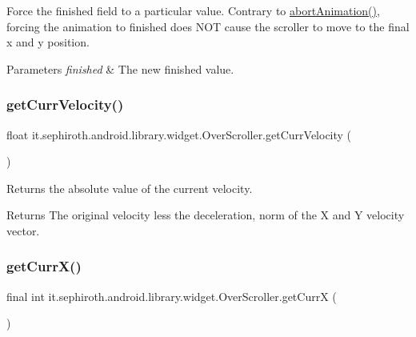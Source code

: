 Force the finished field to a particular value. Contrary to \hyperlink{classit_1_1sephiroth_1_1android_1_1library_1_1widget_1_1_over_scroller_afd65ddc97c8b8c2b2fbafd73e3cff65e}{abort\+Animation()}, forcing the animation to finished does N\+OT cause the scroller to move to the final x and y position.


\begin{DoxyParams}{Parameters}
{\em finished} & The new finished value. \\
\hline
\end{DoxyParams}
\mbox{\label{classit_1_1sephiroth_1_1android_1_1library_1_1widget_1_1_over_scroller_a600fe3b88690cc20248e7ab2379f4015}} 
\subsubsection{\texorpdfstring{get\+Curr\+Velocity()}{getCurrVelocity()}}
{\footnotesize\ttfamily float it.\+sephiroth.\+android.\+library.\+widget.\+Over\+Scroller.\+get\+Curr\+Velocity (\begin{DoxyParamCaption}{ }\end{DoxyParamCaption})}

Returns the absolute value of the current velocity.

\begin{DoxyReturn}{Returns}
The original velocity less the deceleration, norm of the X and Y velocity vector. 
\end{DoxyReturn}
\mbox{\label{classit_1_1sephiroth_1_1android_1_1library_1_1widget_1_1_over_scroller_a1a24d8c79ec65054c25f3e691e6b61fd}} 
\subsubsection{\texorpdfstring{get\+Curr\+X()}{getCurrX()}}
{\footnotesize\ttfamily final int it.\+sephiroth.\+android.\+library.\+widget.\+Over\+Scroller.\+get\+CurrX (\begin{DoxyParamCaption}{ }\end{DoxyParamCaption})}


